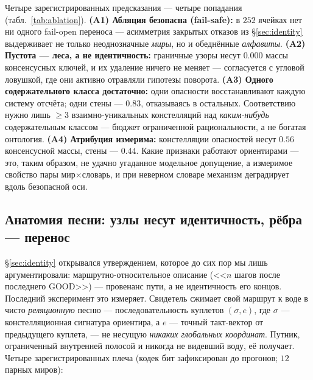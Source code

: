 \documentclass{article}
\begin{document}
Четыре зарегистрированных предсказания --- четыре попадания
(табл.~\ref{tab:ablation}). \textbf{(A1) Абляция безопасна
(fail-safe):} в $252$ ячейках нет ни одного fail-open переноса ---
асимметрия закрытых отказов из \S\ref{sec:identity} выдерживает не
только неоднозначные \emph{миры}, но и обеднённые \emph{алфавиты}.
\textbf{(A2) Пустота --- леса, а не идентичность:} граничные узоры
несут $0.000$ массы консенсусных ключей, и их удаление ничего не
меняет --- согласуется с угловой ловушкой, где они активно отравляли
гипотезы поворота. \textbf{(A3) Одного содержательного класса
достаточно:} одни опасности восстанавливают каждую систему отсчёта;
одни стены --- $0.83$, отказываясь в остальных. Соответствию нужно
лишь $\ge 3$ взаимно-уникальных констелляций над \emph{каким-нибудь}
содержательным классом --- бюджет ограниченной рациональности, а не
богатая онтология. \textbf{(A4) Атрибуция измерима:} констелляции
опасностей несут $0.56$ консенсусной массы, стены --- $0.44$. Какие
признаки работают ориентирами --- это, таким образом, не удачно
угаданное модельное допущение, а измеримое свойство пары
мир$\times$словарь, и при неверном словаре механизм деградирует вдоль
безопасной оси.

\subsection{Анатомия песни: узлы несут идентичность, рёбра --- перенос}
\label{sec:anatomy}

\S\ref{sec:identity} открывался утверждением, которое до сих пор мы
лишь аргументировали: маршрутно-относительное описание (<<$n$ шагов
после последнего GOOD>>) --- провенанс пути, а не идентичность его
концов. Последний эксперимент это измеряет. Свидетель сжимает свой
маршрут к воде в чисто \emph{реляционную} песню --- последовательность
куплетов $(\sigma, e)$, где $\sigma$ --- констелляционная сигнатура
ориентира, а $e$ --- точный такт-вектор от предыдущего куплета, ---
не несущую \emph{никаких глобальных координат}. Путник, ограниченный
внутренней полосой и никогда не видевший воду, её получает. Четыре
зарегистрированных плеча (кодек бит зафиксирован до прогонов; $12$
парных миров):
\end{document}
